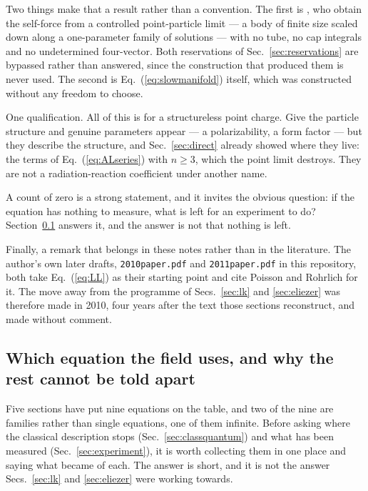 \documentclass[preprint]{aastex701}
\begin{document}
Two things make that a result rather than a convention. The first is
\citet{gralla2009}, who obtain the self-force from a controlled point-particle
limit --- a body of finite size scaled down along a one-parameter family of
solutions --- with no tube, no cap integrals and no undetermined four-vector.
Both reservations of Sec.~\ref{sec:reservations} are bypassed rather than
answered, since the construction that produced them is never used. The second
is Eq.~(\ref{eq:slowmanifold}) itself, which was constructed without any freedom
to choose.

One qualification. All of this is for a structureless point charge. Give the
particle structure and genuine parameters appear --- a polarizability, a form
factor --- but they describe the structure, and Sec.~\ref{sec:direct} already
showed where they live: the terms of Eq.~(\ref{eq:ALseries}) with $n\ge3$,
which the point limit destroys. They are not a radiation-reaction coefficient
under another name.

A count of zero is a strong statement, and it invites the obvious question:
if the equation has nothing to measure, what is left for an experiment to do?
Section~\ref{sec:whichequation} answers it, and the answer is not that nothing
is left.

Finally, a remark that belongs in these notes rather than in the literature. The
author's own later drafts, \texttt{2010paper.pdf} and \texttt{2011paper.pdf} in
this repository, both take Eq.~(\ref{eq:LL}) as their starting point and cite
Poisson and Rohrlich for it. The move away from the programme of
Secs.~\ref{sec:lk} and \ref{sec:eliezer} was therefore made in 2010, four years
after the text those sections reconstruct, and made without comment.

\subsection{Which equation the field uses, and why the rest cannot be told
apart}
\label{sec:whichequation}

Five sections have put nine equations on the table, and two of the nine are
families rather than single equations, one of them infinite. Before asking
where the classical description stops (Sec.~\ref{sec:classquantum}) and what
has been measured (Sec.~\ref{sec:experiment}), it is worth collecting them in
one place and saying what became of each. The answer is short, and it is not
the answer Secs.~\ref{sec:lk} and \ref{sec:eliezer} were working towards.
\end{document}
